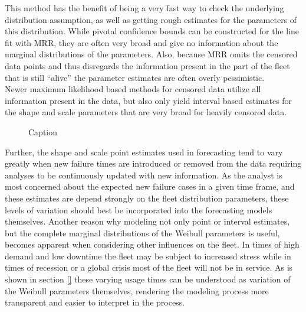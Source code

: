 This method has the benefit of being a very fast way to check the underlying distribution assumption, as well as getting rough estimates for the parameters of this distribution. While pivotal confidence bounds can be constructed for the line fit with MRR, they are often very broad and give no information about the marginal distributions of the parameters. Also, because MRR omits the censored data points and thus disregards the information present in the part of the fleet that is still ``alive'' the parameter estimates are often overly pessimistic. \\
Newer maximum likelihood based methods for censored data utilize all information present in the data, but also only yield interval based estimates for the shape and scale parameters that are very broad for heavily censored data. 
\begin{figure}
    \centering
    \caption{Caption}
    \label{fig:mleintervalls}
\end{figure}
Further, the shape and scale point estimates used in forecasting tend to vary greatly when new failure times are introduced or removed from the data requiring analyses to be continuously updated with new information. As the analyst is most concerned about the expected new failure cases in a given time frame, and these estimates are depend strongly on the fleet distribution parameters, these levels of variation should best be incorporated into the forecasting models themselves. Another reason why modeling not only point or interval estimates, but the complete marginal distributions of the Weibull parameters is useful, becomes apparent when considering other influences on the fleet. In times of high demand and low downtime the fleet may be subject to increased stress while in times of recession or a global crisis most of the fleet will not be in service. As is shown in section \ref{} these varying usage times can be understood as variation of the Weibull parameters themselves, rendering the modeling process more transparent and easier to interpret in the process. 
